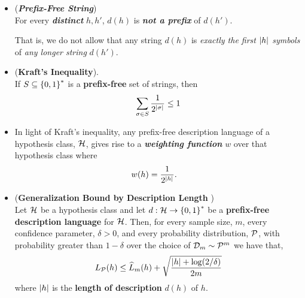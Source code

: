\documentclass[11pt]{article}
\begin{document}
\begin{itemize}
\item \begin{definition} (\textbf{\emph{Prefix-Free String}})\\
For every \emph{\textbf{distinct}} $h, h'$,  $d(h)$ is \emph{\textbf{not a prefix}} of $d(h')$. 

That is, we do not allow that any string $d(h)$ is \emph{exactly the first $\left\lvert h \right\rvert$ symbols} of \emph{any longer string} $d(h')$.
\end{definition}

\item \begin{lemma} (\textbf{Kraft's Inequality}). \\
If $S \subseteq \left\{0,1\right\}^{*}$ is a \textbf{prefix-free} set of strings, then
\begin{align*}
\sum_{\sigma \in S}\frac{1}{2^{\left\lvert \sigma \right\rvert}} \le 1
\end{align*}
\end{lemma}

\item \begin{remark}
In light of Kraft’s inequality, any prefix-free description language of a hypothesis class, ${\mathcal H}$, gives rise to a \emph{\textbf{weighting function}} $w$ over that hypothesis class where
\begin{align*}
w(h) &= \frac{1}{2^{\left\lvert h \right\rvert}}.
\end{align*}
\end{remark}

\item \begin{proposition} (\textbf{Generalization Bound by Description  Length }) \citep{shalev2014understanding} \\
Let ${\mathcal H}$ be a hypothesis class and let $d: {\mathcal H} \to \left\{0,1\right\}^{*}$ be a \textbf{prefix-free description language} for ${\mathcal H}$. Then, for every sample size, $m$, every confidence parameter, $\delta > 0$, and every probability distribution, ${\mathcal P}$, with probability greater than $1 - \delta$ over the choice of ${\mathcal D}_m \sim {\mathcal P}^m$ we have that,
\begin{align}
L_{{\mathcal P}}(h) \le \widehat{L}_{m}(h)  + \sqrt{\frac{\left\lvert h \right\rvert + \log(2/\delta)}{2m}} \label{eqn: srm_generalization_bound_mdl}
\end{align} where $\left\lvert h \right\rvert$ is the \textbf{length of description} $d(h)$ of $h$.
\end{proposition}


\end{itemize}
\end{document}
